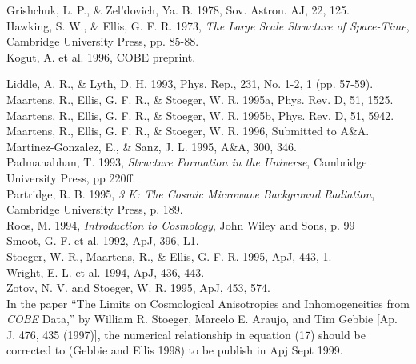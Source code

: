 \noindent
Grishchuk, L. P., \& Zel'dovich, Ya. B. 1978, Sov. Astron. AJ, 22, 125. \\

\noindent
Hawking, S. W., \& Ellis, G. F. R. 1973, {\it The Large Scale Structure of
Space-Time}, Cambridge University Press, pp. 85-88. \\

\noindent
Kogut, A. et al. 1996, COBE preprint.


\noindent
Liddle, A. R., \& Lyth, D. H. 1993, Phys. Rep., 231, No. 1-2, 1 (pp. 57-59).\\

\noindent
Maartens, R., Ellis, G. F. R., \& Stoeger, W. R. 1995a, Phys. Rev. D, 51,
1525. \\

\noindent
Maartens, R., Ellis, G. F. R., \& Stoeger, W. R. 1995b, Phys. Rev. D, 51,
5942. \\

\noindent
Maartens, R., Ellis, G. F. R., \& Stoeger, W. R. 1996, Submitted to A\&A. \\

\noindent
Martinez-Gonzalez, E., \& Sanz, J. L. 1995, A\&A, 300, 346. \\

\noindent
Padmanabhan, T. 1993, {\it Structure Formation in the Universe}, Cambridge
University Press, pp 220ff. \\

\noindent
Partridge, R. B. 1995, {\it 3 K: The Cosmic Microwave Background Radiation},
Cambridge University Press, p. 189. \\

\noindent
Roos, M. 1994, {\it Introduction to Cosmology}, John Wiley and Sons, 
  p. 99 \\

\noindent
Smoot, G. F. et al. 1992, ApJ, 396, L1. \\

\noindent
Stoeger, W. R., Maartens, R., \& Ellis, G. F. R. 1995, ApJ, 443, 1. \\

\noindent
Wright, E. L. et al. 1994, ApJ, 436, 443. \\

\noindent
Zotov, N. V. and Stoeger, W. R. 1995, ApJ, 453, 574. \\


In the paper ``The Limits on Cosmological Anisotropies and Inhomogeneities
from {\it COBE} Data,'' by William R. Stoeger, Marcelo E. Araujo, and Tim
Gebbie [Ap. J. 476, 435 (1997)], the numerical relationship in equation (17)
should be corrected to (Gebbie and Ellis 1998) to be publish in Apj Sept
1999.



